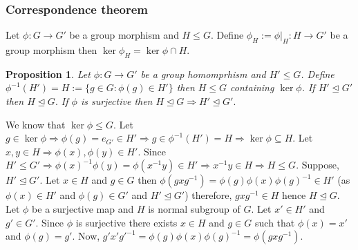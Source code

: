 \documentclass[11pt]{amsart}
\newtheorem{prop}[theorem]{Proposition}
\begin{document}
\subsubsection{Correspondence theorem}
Let $\phi:G\to G'$ be a group morphism and $H\leq G$. Define $\phi_H:=\phi\big|_H:H\to G'$ be a group morphism then $\ker\phi_H=\ker\phi\cap H.$
\begin{prop}
Let $\phi:G\to G'$ be a group homomprhism and $H'\leq G$. Define $\phi^{-1}(H')=H:=\{g\in G:\phi(g)\in H'\}$ then $H\leq G$ containing $\ker\phi$. If $H'\unlhd G'$ then $H\unlhd G.$ If $\phi$ is surjective then $H\unlhd G \Rightarrow H'\unlhd G'.$
\end{prop}
\proof We know that $\ker\phi\leq G.$ Let $g\in \ker\phi \Rightarrow \phi(g)=e_{G'}\in H' \Rightarrow g\in \phi^{-1}(H')=H \Rightarrow \ker\phi\subseteq H.$ Let $x,y\in H \Rightarrow \phi(x),\phi(y)\in H'.$ Since $H'\leq G' \Rightarrow \phi(x)^{-1}\phi(y)=\phi(x^{-1}y)\in H' \Rightarrow x^{-1}y\in H \Rightarrow H\leq G.$ Suppose, $H'\unlhd G'$. Let $x\in H$ and $g\in G$ then $\phi(gxg^{-1})=\phi(g)\phi(x)\phi(g)^{-1}\in H'$ (as $\phi(x)\in H'$ and $\phi(g)\in G'$ and $H'\unlhd G'$) therefore, $gxg^{-1}\in H$ hence $H\unlhd G.$ Let $\phi$ be a surjective map and $H$ is  normal subgroup of $G$. Let $x'\in H'$ and $g'\in G'$. Since $\phi$ is surjective there exists $x\in H$ and $g\in G$ such that $\phi(x)=x'$ and $\phi(g)=g'.$ Now, $g'x'g'^{-1}=\phi(g)\phi(x)\phi(g)^{-1}=\phi(gxg^{-1}).$
\end{document}
